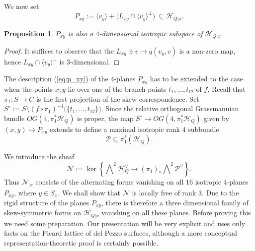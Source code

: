 \documentclass[11pt]{amsart}
\newtheorem{proposition}[theorem]{Proposition}
\theoremstyle{definition}
\def\cN{\mathcal{N}}
\def\cH{\mathcal{H}}
\begin{document}
We now set
\begin{equation}\label{eq:p_xy}
P_{xy}:=
\langle v_y\rangle+
\bigl(L_{xy}\cap \langle v_y\rangle ^{\perp}\bigr)\
\subseteq\mathcal H_{Q|x}.
\end{equation}

\begin{proposition}
$P_{xy}$ is also a $4$-dimensional isotropic subspace of $\cH_{Q|x}$.      
\end{proposition}
\begin{proof} It suffices to observe that the $L_{xy}\ni v\mapsto q(v_y,v)$ is a non-zero  map, hence $L_{xy}\cap \langle v_y\rangle ^{\perp}$ is $3$-dimensional.
\end{proof}

The description (\ref{eq:p_xy}) of the $4$-planes $P_{xy}$ has to be extended to the case when the points $x, y$ lie over one of the branch points $t_1, \ldots, t_{12}$ of $f$. Recall that  $\pi_1\colon S\to C$ is the first projection of the skew correspondence. Set $S^{\circ}:=S\setminus (f\circ \pi_1)^{-1}\bigl(\{t_1, \ldots, t_{12}\bigr\}\bigr)$. Since the relative orthogonal Grassmannian bundle $OG(4, \pi_1^*\cH_Q)$ is proper,
the map $S^{\circ}\rightarrow OG(4, \pi_1^*\cH_Q)$ given by  $(x,y)\mapsto P_{xy}$ extends  to define a maximal isotropic rank $4$ subbundle
\begin{equation}\label{eq:P4}
\mathcal P\subseteq \pi_1^*(\mathcal H_Q).
\end{equation}




\vskip 4pt


We introduce the sheaf
\begin{equation}\label{eq:N}
\mathcal N:=
\ker\left\{
\bigwedge\nolimits^2\mathcal H_Q^\vee
\longrightarrow
(\pi_1)_*\bigwedge\nolimits^2\mathcal P^\vee
\right\}.
\end{equation}
Thus $\mathcal N_{|x}$ consists of the alternating
forms vanishing on all $16$ isotropic $4$-planes
$P_{xy}$, where $y\in S_x$. We shall show that $\cN$ is locally free of rank $3$. Due to the rigid structure of the planes $P_{xy}$, there is therefore a three dimensional family of skew-symmetric forms on $\cH_{Q|x}$ vanishing on all these planes. Before proving this we need some preparation. Our presentation will be very explicit and uses only facts on the Picard lattice of del Pezzo surfaces, although a more conceptual representation-theoretic proof is certainly possible.

\vskip 4pt
\end{document}
